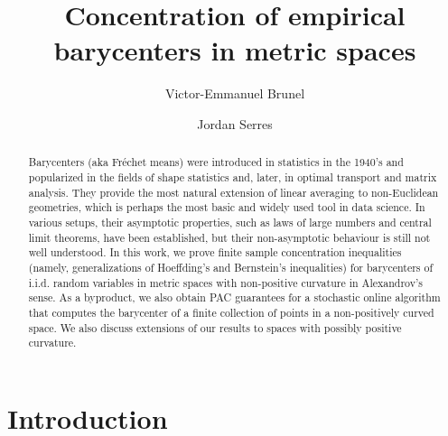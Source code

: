 \documentclass[10pt,a4paper]{article}
\title{Concentration of empirical barycenters in metric spaces}
\author[1]{Victor-Emmanuel Brunel}
\author[2]{Jordan Serres}
\affil[1]{CREST-ENSAE, Victor-Emmanuel.Brunel@ensae.fr}
\affil[2]{CREST-ENSAE, jordan.serres@ensae.fr}
\theoremstyle{plain}
\theoremstyle{definition}
\theoremstyle{remark}
\begin{document}
\maketitle

\begin{abstract}

Barycenters (aka Fréchet means) were introduced in statistics in the 1940's and popularized in the fields of shape statistics and, later, in optimal transport and matrix analysis. They provide the most natural extension of linear averaging to non-Euclidean geometries, which is perhaps the most basic and widely used tool in data science. In various setups, their asymptotic properties, such as laws of large numbers and central limit theorems, have been established, but their non-asymptotic behaviour is still not well understood. In this work, we prove finite sample concentration inequalities (namely, generalizations of Hoeffding's and Bernstein's inequalities) for barycenters of i.i.d. random variables in metric spaces with non-positive curvature in Alexandrov's sense. As a byproduct, we also obtain PAC guarantees for a stochastic online algorithm that computes the barycenter of a finite collection of points in a non-positively curved space. We also discuss extensions of our results to spaces with possibly positive curvature. 

\end{abstract}


\section{Introduction}
\end{document}
